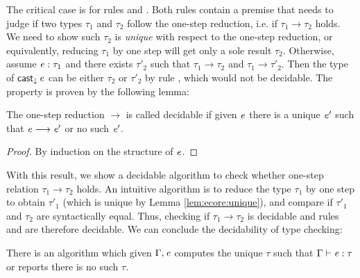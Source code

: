 The critical case is for rules  and .
Both rules contain a premise that needs to judge if two types $\tau_{{\mathrm{1}}}$ and
$\tau_{{\mathrm{2}}}$ follow the one-step reduction, i.e. if $\tau_{{\mathrm{1}}}  \longrightarrow  \tau_{{\mathrm{2}}}$ holds. We need
to show such $\tau_{{\mathrm{2}}}$ is \emph{unique} with respect to the one-step reduction,
or equivalently, reducing $\tau_{{\mathrm{1}}}$ by one step will get only a sole result
$\tau_{{\mathrm{2}}}$. Otherwise, assume $\mathit{e}:\tau_{{\mathrm{1}}}$ and there exists $\tau'_{{\mathrm{2}}}$ such that
$\tau_{{\mathrm{1}}}  \longrightarrow  \tau_{{\mathrm{2}}}$ and $\tau_{{\mathrm{1}}}  \longrightarrow  \tau'_{{\mathrm{2}}}$. Then the type of $\mathsf{cast}_{\downarrow} \, \mathit{e}$ can be
either $\tau_{{\mathrm{2}}}$ or $\tau'_{{\mathrm{2}}}$ by rule , which
would not be
decidable. The property is proven by the following lemma:

\begin{lem}\label{lem:ecore:unique}
	The one-step reduction $ \longrightarrow $ is called decidable if 
given $\mathit{e}$ there is a unique $\mathit{e'}$ such that $\mathit{e}  \longrightarrow  \mathit{e'}$ or no such $\mathit{e'}$.
\end{lem}

\begin{proof}
	By induction on the structure of $\mathit{e}$.
\end{proof}

With this result, we show a decidable algorithm to check whether one-step
relation $\tau_{{\mathrm{1}}}  \longrightarrow  \tau_{{\mathrm{2}}}$ holds. An intuitive algorithm is to reduce the type
$\tau_{{\mathrm{1}}}$ by one step to obtain $\tau'_{{\mathrm{1}}}$ (which is unique by Lemma
\ref{lem:ecore:unique}), and compare if $\tau'_{{\mathrm{1}}}$ and $\tau_{{\mathrm{2}}}$ are
syntactically equal. Thus, checking if $\tau_{{\mathrm{1}}}  \longrightarrow  \tau_{{\mathrm{2}}}$ is decidable and rules
 and  are therefore decidable. We can
conclude the decidability of type checking:

\begin{thm}\label{lem:ecore:decide}
	There is an algorithm which given $\Gamma, \mathit{e}$ computes the unique
$\tau$ such that $\Gamma  \vdash  \mathit{e}  :  \tau$ or reports there is no such $\tau$.
\end{thm}

